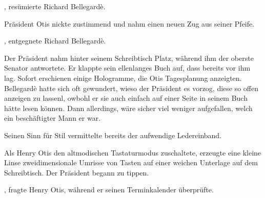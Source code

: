 \par

, resümierte Richard Bellegardè. 

\par

Präsident Otis nickte zustimmend und nahm einen neuen Zug aus seiner Pfeife. 

\par

, entgegnete Richard Bellegardè. 

\par

Der Präsident nahm hinter seinem Schreibtisch Platz, während ihm der oberste Senator antwortete. Er klappte sein ellenlanges Buch auf, dass bereits vor ihm lag. Sofort erschienen einige Hologramme, die Otis Tagesplanung anzeigten. Bellegardè hatte sich oft gewundert, wieso der Präsident es vorzog, diese so offen anzeigen zu lassenl, owbohl er sie auch einfach auf einer Seite in seinem Buch hätte lesen können. Dann allerdings, wäre sicher viel weniger aufgefallen, welch ein beschäftigter Mann er war.

\par

Seinen Sinn für Stil vermittelte bereits der aufwendige Ledereinband.

\par

Als Henry Otis den altmodischen Tastaturmodus zuschaltete, erzeugte eine kleine Linse zweidimensionale Umrisse von Tasten auf einer weichen Unterlage auf dem Schreibtisch. Der Präsident begann zu tippen.

\par

, fragte Henry Otis, während er seinen Terminkalender überprüfte.

